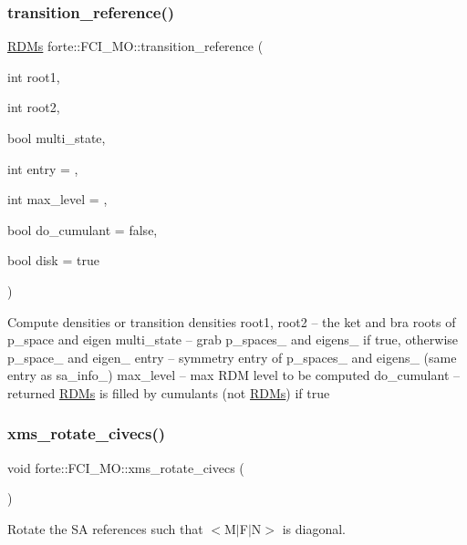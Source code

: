 \subsubsection{\texorpdfstring{transition\+\_\+reference()}{transition\_reference()}}
{\footnotesize\ttfamily \mbox{\hyperlink{classforte_1_1_r_d_ms}{R\+D\+Ms}} forte\+::\+F\+C\+I\+\_\+\+M\+O\+::transition\+\_\+reference (\begin{DoxyParamCaption}\item[{int}]{root1,  }\item[{int}]{root2,  }\item[{bool}]{multi\+\_\+state,  }\item[{int}]{entry = {},  }\item[{int}]{max\+\_\+level = {},  }\item[{bool}]{do\+\_\+cumulant = {\ttfamily false},  }\item[{bool}]{disk = {\ttfamily true} }\end{DoxyParamCaption})}

Compute densities or transition densities root1, root2 -- the ket and bra roots of p\+\_\+space and eigen multi\+\_\+state -- grab p\+\_\+spaces\+\_\+ and eigens\+\_\+ if true, otherwise p\+\_\+space\+\_\+ and eigen\+\_\+ entry -- symmetry entry of p\+\_\+spaces\+\_\+ and eigens\+\_\+ (same entry as sa\+\_\+info\+\_\+) max\+\_\+level -- max R\+DM level to be computed do\+\_\+cumulant -- returned \mbox{\hyperlink{classforte_1_1_r_d_ms}{R\+D\+Ms}} is filled by cumulants (not \mbox{\hyperlink{classforte_1_1_r_d_ms}{R\+D\+Ms}}) if true \mbox{\label{classforte_1_1_f_c_i___m_o_abaf9144ef5b7fa0c98720820f89d7d78}} 
\subsubsection{\texorpdfstring{xms\+\_\+rotate\+\_\+civecs()}{xms\_rotate\_civecs()}}
{\footnotesize\ttfamily void forte\+::\+F\+C\+I\+\_\+\+M\+O\+::xms\+\_\+rotate\+\_\+civecs (\begin{DoxyParamCaption}{ }\end{DoxyParamCaption})}



Rotate the SA references such that $<$M$\vert$\+F$\vert$N$>$ is diagonal. 


